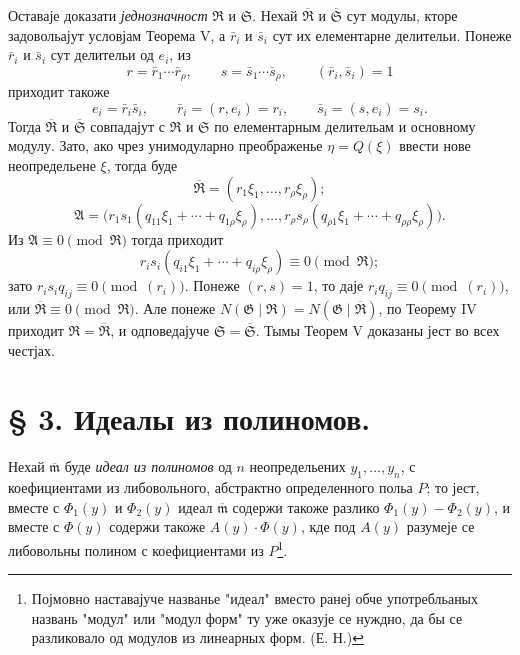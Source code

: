 \documentclass[11pt]{article}
\providecommand{\Amod}{\mathfrak A}
\providecommand{\Gmod}{\mathfrak G}
\providecommand{\Rmod}{\mathfrak R}
\providecommand{\Smod}{\mathfrak S}
\providecommand{\mideal}{\mathfrak m}
\providecommand{\zero}[1]{\equiv 0\pmod{#1}}
\providecommand{\Norm}{N}
\begin{document}
Оставаје доказати \emph{једнозначност} $\Rmod$ и $\Smod$. Нехай $\overline{\Rmod}$ и $\overline{\Smod}$ сут модулы, кторе задовольајут условјам Теорема V, а $\bar r_i$ и $\bar s_i$ сут их елементарне делительи. Понеже $\bar r_i$ и $\bar s_i$ сут делительи од $e_i$, из
\[
 r=\bar r_1\cdots\bar r_\rho,
 \qquad
 s=\bar s_1\cdots\bar s_\rho,
 \qquad
 (\bar r_i,\bar s_i)=1
\]
приходит такоже
\[
 e_i=\bar r_i\bar s_i,
 \qquad
 \bar r_i=(r,e_i)=r_i,
 \qquad
 \bar s_i=(s,e_i)=s_i.
\]
Тогда $\overline{\Rmod}$ и $\overline{\Smod}$ совпадајут с $\Rmod$ и $\Smod$ по елементарным делительам и основному модулу. Зато, ако чрез унимодуларно преображенье $\eta=Q(\xi)$ ввести нове неопредельене $\xi$, тогда буде
\[
 \overline{\Rmod}=(r_1\xi_1,\ldots,r_\rho\xi_\rho);
\]
\[
 \Amod=\bigl(r_1s_1(q_{11}\xi_1+\cdots+q_{1\rho}\xi_\rho),\ldots,
 r_\rho s_\rho(q_{\rho1}\xi_1+\cdots+q_{\rho\rho}\xi_\rho)\bigr).
\]
Из $\Amod\zero{\Rmod}$ тогда приходит
\[
 r_i s_i(q_{i1}\xi_1+\cdots+q_{i\rho}\xi_\rho)\zero{\Rmod};
\]
зато $r_is_iq_{ij}\zero{(r_i)}$. Понеже $(r,s)=1$, то даје $r_iq_{ij}\zero{(r_i)}$, или $\overline{\Rmod}\zero{\Rmod}$. Але понеже $\Norm(\Gmod\mid\Rmod)=\Norm(\Gmod\mid\overline{\Rmod})$, по Теорему IV приходит $\Rmod=\overline{\Rmod}$, и одповедајуче $\Smod=\overline{\Smod}$. Тымы Теорем V доказаны јест во всех честјах.


\section*{§ 3. Идеалы из полиномов.}

Нехай $\overline{\mideal}$ буде {\itshape идеал из полиномов} од $n$ неопредельених $y_1,\ldots,y_n$, с коефициентами из либовольного, абстрактно определенного польа $P$; то јест, вместе с $\Phi_1(y)$ и $\Phi_2(y)$ идеал $\overline{\mideal}$ содержи такоже разлико $\Phi_1(y)-\Phi_2(y)$, и вместе с $\Phi(y)$ содержи такоже $A(y)\cdot\Phi(y)$, кде под $A(y)$ разумеје се либовольны полином с коефициентами из $P$\footnote{Појмовно наставајуче названье "идеал" вместо ранеј обче употребльаных названь "модул" или "модул форм" ту уже оказује се нуждно, да бы се разликовало од модулов из линеарных форм. (Е. Н.)}.
\end{document}
